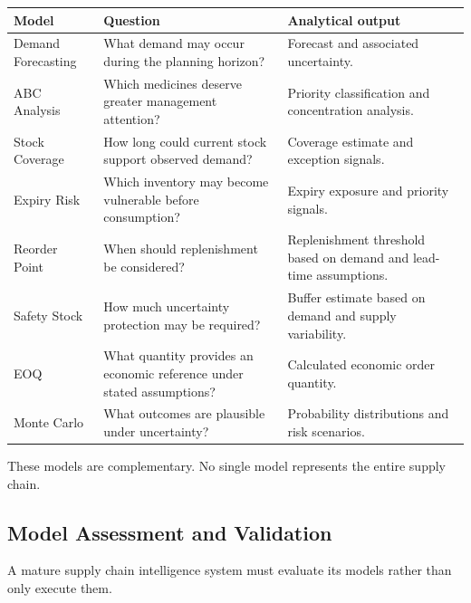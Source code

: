 \documentclass[12pt]{article}
\begin{document}
\begin{center}

\begin{tabularx}{\textwidth}{p{38mm} X X}
\hline
\textbf{Model} &
\textbf{Question} &
\textbf{Analytical output} \\
\hline

Demand Forecasting &
What demand may occur during the planning horizon? &
Forecast and associated uncertainty. \\

ABC Analysis &
Which medicines deserve greater management attention? &
Priority classification and concentration analysis. \\

Stock Coverage &
How long could current stock support observed demand? &
Coverage estimate and exception signals. \\

Expiry Risk &
Which inventory may become vulnerable before consumption? &
Expiry exposure and priority signals. \\

Reorder Point &
When should replenishment be considered? &
Replenishment threshold based on demand and lead-time assumptions. \\

Safety Stock &
How much uncertainty protection may be required? &
Buffer estimate based on demand and supply variability. \\

EOQ &
What quantity provides an economic reference under stated assumptions? &
Calculated economic order quantity. \\

Monte Carlo &
What outcomes are plausible under uncertainty? &
Probability distributions and risk scenarios. \\

\hline
\end{tabularx}

\end{center}

These models are complementary. No single model represents the entire supply
chain.

\subsection{Model Assessment and Validation}

A mature supply chain intelligence system must evaluate its models rather than
only execute them.
\end{document}
